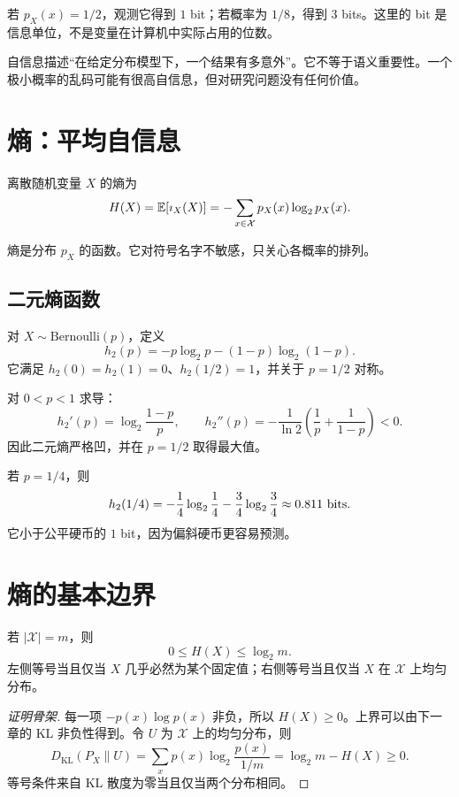 若 $p_X(x)=1/2$，观测它得到 $1$ bit；若概率为 $1/8$，得到 $3$ bits。这里的 bit 是信息单位，不是变量在计算机中实际占用的位数。

\begin{warningbox}
自信息描述“在给定分布模型下，一个结果有多意外”。它不等于语义重要性。一个极小概率的乱码可能有很高自信息，但对研究问题没有任何价值。
\end{warningbox}

\section{熵：平均自信息}

\begin{definition}[Shannon 熵]
离散随机变量 $X$ 的熵为
\[
H(X)=\mathbb{E}[\imath_X(X)]
=-\sum_{x\in\mathcal X}p_X(x)\log_2 p_X(x).
\]
\end{definition}

熵是分布 $p_X$ 的函数。它对符号名字不敏感，只关心各概率的排列。

\subsection{二元熵函数}

对 $X\sim\mathrm{Bernoulli}(p)$，定义
\[
h_2(p)=-p\log_2 p-(1-p)\log_2(1-p).
\]
它满足 $h_2(0)=h_2(1)=0$、$h_2(1/2)=1$，并关于 $p=1/2$ 对称。

对 $0<p<1$ 求导：
\[
h_2'(p)=\log_2\frac{1-p}{p},
\qquad
h_2''(p)=-\frac{1}{\ln 2}\left(\frac1p+\frac1{1-p}\right)<0.
\]
因此二元熵严格凹，并在 $p=1/2$ 取得最大值。

\begin{example}[偏斜硬币]
若 $p=1/4$，则
\[
h_2(1/4)
=-\frac14\log_2\frac14-\frac34\log_2\frac34
\approx 0.811\text{ bits}.
\]
它小于公平硬币的 $1$ bit，因为偏斜硬币更容易预测。
\end{example}

\section{熵的基本边界}

\begin{theorem}[有限字母表上的熵界]
若 $|\mathcal X|=m$，则
\[
0\le H(X)\le \log_2 m.
\]
左侧等号当且仅当 $X$ 几乎必然为某个固定值；右侧等号当且仅当 $X$ 在 $\mathcal X$ 上均匀分布。
\end{theorem}

\begin{proof}[证明骨架]
每一项 $-p(x)\log p(x)$ 非负，所以 $H(X)\ge 0$。上界可以由下一章的 KL 非负性得到。令 $U$ 为 $\mathcal X$ 上的均匀分布，则
\[
D_{\mathrm{KL}}(P_X\|U)
=\sum_x p(x)\log_2\frac{p(x)}{1/m}
=\log_2 m-H(X)\ge 0.
\]
等号条件来自 KL 散度为零当且仅当两个分布相同。
\end{proof}

